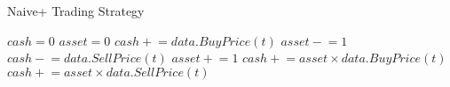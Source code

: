 \documentclass[12pt]{article}
\newcommand{\pluseq}{\mathrel{+}=}
\newcommand{\mineq}{\mathrel{-}=}
\begin{document}
\begin{algorithm}
\caption{Naive+ Trading Strategy}
\begin{algorithmic}[1]
\State $cash = 0$
\State $asset = 0$
	\State $cash \pluseq data.BuyPrice(\textit{t})$
	\State $asset \mineq 1$
	\State $cash \mineq data.SellPrice(\textit{t})$	
	\State $asset \pluseq 1$
	\EndIf
\EndFor
{} 
\State $cash \pluseq asset \times data.BuyPrice(\textit{t})$
\State $cash \pluseq asset \times data.SellPrice(\textit{t})$	
\EndIf
\end{algorithmic}
\end{algorithm}


\end{document}
